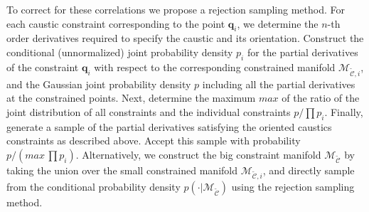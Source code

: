 \documentclass[a4paper, 11pt]{article}
\begin{document}
To correct for these correlations we propose a rejection sampling method. For each caustic constraint corresponding to the point $\bm{q}_i$, we determine the $n$-th order derivatives required to specify the caustic and its orientation. Construct the conditional (unnormalized) joint probability density $p_i$ for the partial derivatives of the constraint $\bm{q}_i$ with respect to the corresponding constrained manifold $\mathcal{M}_{\mathcal{\tilde C},i}$, and the Gaussian joint probability density $p$ including all the partial derivatives at the constrained points. Next, determine the maximum $max$ of the ratio of the joint distribution of all constraints and the individual constraints $p/\prod p_i$. Finally, generate a sample of the partial derivatives satisfying the oriented caustics constraints as described above. Accept this sample with probability $p/(max\, \prod p_i)$. Alternatively, we construct the big constraint manifold $\mathcal{M}_\mathcal{\tilde C}$ by taking the union over the small constrained manifold $\mathcal{M}_{\mathcal{\tilde C},i}$, and directly sample from the conditional probability density $p(\cdot |\mathcal{M}_\mathcal{\tilde C})$ using the rejection sampling method.
\end{document}
